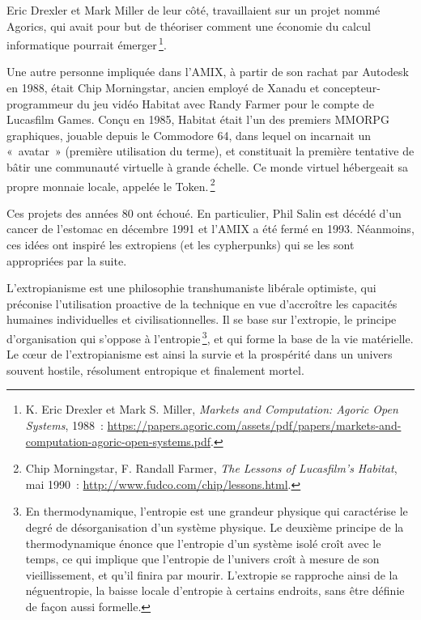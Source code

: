 \documentclass[a4paper,notitlepage]{article}
\newcommand{\eng}[1]{{\NoAutoSpaceBeforeFDP\emph{#1}}}  %
\newcommand{\sfootnote}{\,\footnote}
\begin{document}
Eric Drexler et Mark Miller de leur côté, travaillaient sur un projet nommé Agorics, qui avait pour but de théoriser comment une économie du calcul informatique pourrait émerger\sfootnote{K. Eric Drexler et Mark S. Miller, \eng{Markets and Computation: Agoric Open Systems}, 1988~: \url{https://papers.agoric.com/assets/pdf/papers/markets-and-computation-agoric-open-systems.pdf}.}.

Une autre personne impliquée dans l'AMIX, à partir de son rachat par Autodesk en 1988, était Chip Morningstar, ancien employé de Xanadu et concepteur-programmeur du jeu vidéo Habitat avec Randy Farmer pour le compte de Lucasfilm Games. Conçu en 1985, Habitat était l'un des premiers MMORPG graphiques, jouable depuis le Commodore 64, dans lequel on incarnait un «~avatar~» (première utilisation du terme), et constituait la première tentative de bâtir une communauté virtuelle à grande échelle. Ce monde virtuel hébergeait sa propre monnaie locale, appelée le Token.\sfootnote{Chip Morningstar, F. Randall Farmer, \eng{The Lessons of Lucasfilm's Habitat}, mai 1990~: \url{http://www.fudco.com/chip/lessons.html}.}

Ces projets des années 80 ont échoué. En particulier, Phil Salin est décédé d'un cancer de l'estomac en décembre 1991 et l'AMIX a été fermé en 1993. Néanmoins, ces idées ont inspiré les extropiens (et les cypherpunks) qui se les sont appropriées par la suite.


L'extropianisme est une philosophie transhumaniste libérale optimiste, qui préconise l'utilisation proactive de la technique en vue d'accroître les capacités humaines individuelles et civilisationnelles. Il se base sur l'extropie, le principe d'organisation qui s'oppose à l'entropie\sfootnote{En thermodynamique, l'entropie est une grandeur physique qui caractérise le degré de désorganisation d'un système physique. Le deuxième principe de la thermodynamique énonce que l'entropie d'un système isolé croît avec le temps, ce qui implique que l'entropie de l'univers croît à mesure de son vieillissement, et qu'il finira par mourir. L'extropie se rapproche ainsi de la néguentropie, la baisse locale d'entropie à certains endroits, sans être définie de façon aussi formelle.}, et qui forme la base de la vie matérielle. Le cœur de l'extropianisme est ainsi la survie et la prospérité dans un univers souvent hostile, résolument entropique et finalement mortel.
\end{document}
